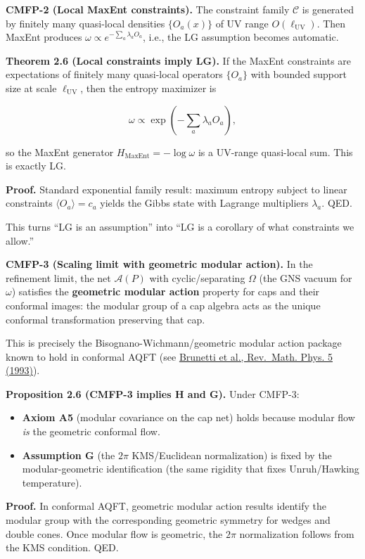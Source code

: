 \documentclass[11pt,a4paper]{article}
\theoremstyle{remark}
\providecommand{\tightlist}{%
  \setlength{\itemsep}{0pt}\setlength{\parskip}{0pt}}
\begin{document}
\textbf{CMFP-2 (Local MaxEnt constraints).} The constraint family \(\mathcal{C}\) is
generated by finitely many quasi-local densities \(\{O_a(x)\}\) of UV range
\(O(\ell_{\mathrm{UV}})\). Then MaxEnt produces \(\omega \propto e^{-\sum_a \lambda_a O_a}\),
i.e., the LG assumption becomes automatic.

\textbf{Theorem 2.6 (Local constraints imply LG).} If the MaxEnt constraints are
expectations of finitely many quasi-local operators \(\{O_a\}\) with bounded
support size at scale \(\ell_{\mathrm{UV}}\), then the entropy maximizer is

\[
\omega \propto \exp\left(-\sum_a \lambda_a O_a\right),
\]

so the MaxEnt generator \(H_{\mathrm{MaxEnt}} = -\log \omega\) is a UV-range
quasi-local sum. This is exactly LG.

\textbf{Proof.} Standard exponential family result: maximum entropy subject to
linear constraints \(\langle O_a \rangle = c_a\) yields the Gibbs state with
Lagrange multipliers \(\lambda_a\). QED.

This turns ``LG is an assumption'' into ``LG is a corollary of what constraints we
allow.''

\textbf{CMFP-3 (Scaling limit with geometric modular action).} In the refinement
limit, the net \(\mathcal{A}(P)\) with cyclic/separating \(\Omega\) (the GNS vacuum
for \(\omega\)) satisfies the \textbf{geometric modular action} property for caps and
their conformal images: the modular group of a cap algebra acts as the unique
conformal transformation preserving that cap.

This is precisely the Bisognano-Wichmann/geometric modular action package known
to hold in conformal AQFT (see
\href{https://arxiv.org/abs/funct-an/9302008}{Brunetti et al., Rev.~Math. Phys. 5 (1993)}).

\textbf{Proposition 2.6 (CMFP-3 implies H and G).} Under CMFP-3:

\begin{itemize}
\tightlist
\item
  \textbf{Axiom A5} (modular covariance on the cap net) holds because modular
  flow \emph{is} the geometric conformal flow.
\item
  \textbf{Assumption G} (the \(2\pi\) KMS/Euclidean normalization) is fixed by the
  modular-geometric identification (the same rigidity that fixes
  Unruh/Hawking temperature).
\end{itemize}

\textbf{Proof.} In conformal AQFT, geometric modular action results identify the
modular group with the corresponding geometric symmetry for wedges and
double cones. Once modular flow is geometric, the \(2\pi\) normalization
follows from the KMS condition. QED.
\end{document}
